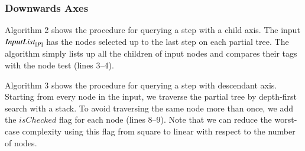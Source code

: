 \subsubsection{Downwards Axes}

Algorithm 2 shows the procedure for querying a step with a child axis. 
The input $\mathit{InputList}_{[P]}$ has the nodes selected up to the last step on each partial tree.
The algorithm simply lists up all the children of input nodes and compares their tags with the node test (lines 3--4).

Algorithm 3 shows the procedure for querying a step with descendant axis.
Starting from every node in the input, we traverse the partial tree by 
depth-first search with a stack. 
To avoid traversing the same node more than once, we add the $\mathit{isChecked}$ flag for each node (lines 8--9).
Note that we can reduce the worst-case complexity using this flag from square to linear with respect to the number of nodes.

